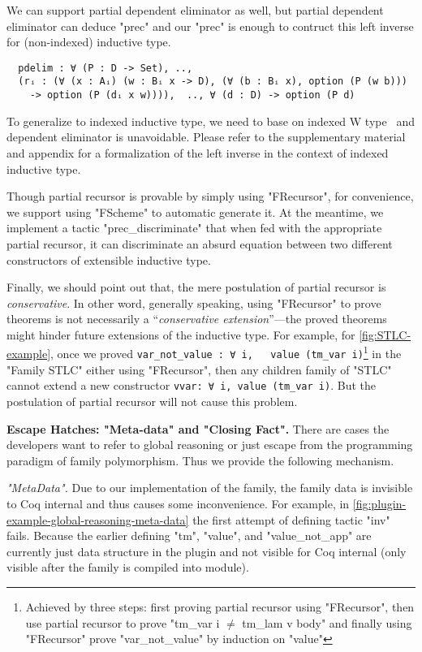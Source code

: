 We can support partial dependent eliminator as well, but partial dependent eliminator can deduce "prec" and our "prec" is enough to contruct this left inverse for (non-indexed) inductive type. 
\begin{verbatim}
  pdelim : ∀ (P : D -> Set), .., 
  (rᵢ : (∀ (x : Aᵢ) (w : Bᵢ x -> D), (∀ (b : Bᵢ x), option (P (w b))) 
    -> option (P (dᵢ x w)))),  .., ∀ (d : D) -> option (P d)
\end{verbatim}
To generalize to indexed inductive type, we need to base on indexed W type~\cite{martin1982constructive, morris2009indexed,jashug2017} and dependent eliminator is unavoidable. Please refer to the supplementary material and appendix for a formalization of the left inverse in the context of indexed inductive type. 

Though partial recursor is provable by simply using "FRecursor", for convenience, we support using "FScheme" to automatic generate it. At the meantime, we implement a tactic "prec_discriminate" that when fed with the appropriate partial recursor, it can discriminate an absurd equation between two different constructors of extensible inductive type.

Finally, we should point out that, the mere postulation of partial recursor is \textit{conservative}. In other word, generally speaking, using "FRecursor" to prove theorems is not necessarily a ``\textit{conservative extension}''---the proved theorems might hinder future extensions of the inductive type. For example, for \cref{fig:STLC-example}, once we proved \texttt{var_not_value : ∀ i, ~ value (tm_var i)}\footnote{Achieved by three steps: first proving partial recursor using "FRecursor", then use partial recursor to prove "tm_var i $\neq$ tm_lam v body" and finally using "FRecursor" prove "var_not_value" by induction on "value"} in the "Family STLC" either using "FRecursor", then any children family of "STLC" cannot extend a new constructor \texttt{vvar: ∀ i, value (tm_var i)}. But the postulation of partial recursor will not cause this problem.


\textbf{Escape Hatches: "Meta-data" and "Closing Fact".} There are cases the developers want to refer to global reasoning or just escape from the programming paradigm of family polymorphism. Thus we provide the following mechanism.

\textit{"MetaData".} Due to our implementation of the family,
the family data is invisible to Coq internal and thus causes some
inconvenience. For example, in
\cref{fig:plugin-example-global-reasoning-meta-data} the first attempt
of defining tactic "inv" fails. Because the earlier defining "tm",
"value", and "value_not_app" are currently just data structure in the
plugin and not visible for Coq internal (only visible after the family
is compiled into module). 

